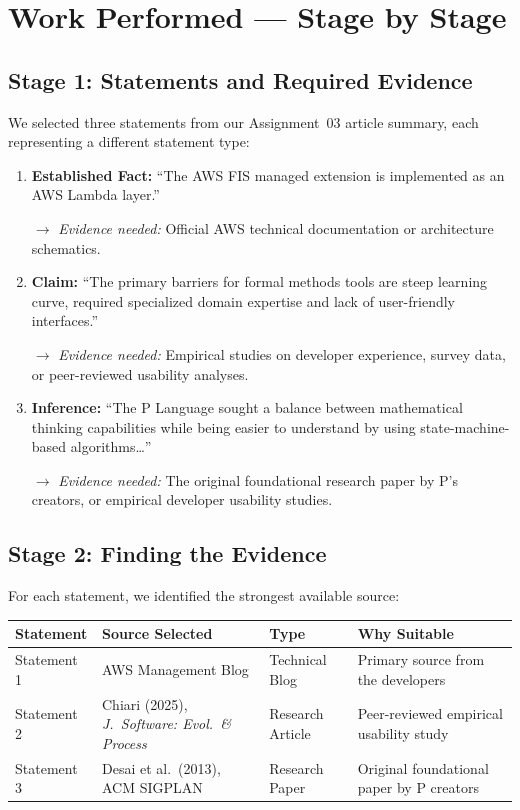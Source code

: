 \documentclass[11pt, a4paper]{article}
\begin{document}
\section{Work Performed --- Stage by Stage}

\subsection{Stage 1: Statements and Required Evidence}
We selected three statements from our Assignment~03 article summary, each representing a different statement type:

\begin{enumerate}[nosep]
    \item \textbf{Established Fact:} ``The AWS FIS managed extension is implemented as an AWS Lambda layer.''
    
    $\rightarrow$ \textit{Evidence needed:} Official AWS technical documentation or architecture schematics.
    
    \item \textbf{Claim:} ``The primary barriers for formal methods tools are steep learning curve, required specialized domain expertise and lack of user-friendly interfaces.''
    
    $\rightarrow$ \textit{Evidence needed:} Empirical studies on developer experience, survey data, or peer-reviewed usability analyses.
    
    \item \textbf{Inference:} ``The P Language sought a balance between mathematical thinking capabilities while being easier to understand by using state-machine-based algorithms\ldots''
    
    $\rightarrow$ \textit{Evidence needed:} The original foundational research paper by P's creators, or empirical developer usability studies.
\end{enumerate}

\subsection{Stage 2: Finding the Evidence}
For each statement, we identified the strongest available source:

\begin{tabular}{@{}p{3cm} p{4cm} p{3cm} p{4.5cm}@{}}
    \toprule
    \textbf{Statement} & \textbf{Source Selected} & \textbf{Type} & \textbf{Why Suitable} \\
    \midrule
    Statement 1 & AWS Management Blog & Technical Blog & Primary source from the developers \\
    Statement 2 & Chiari (2025), \textit{J.\ Software: Evol.\ \& Process} & Research Article & Peer-reviewed empirical usability study \\
    Statement 3 & Desai et al.\ (2013), ACM SIGPLAN & Research Paper & Original foundational paper by P creators \\
    \bottomrule
\end{tabular}
\end{document}
